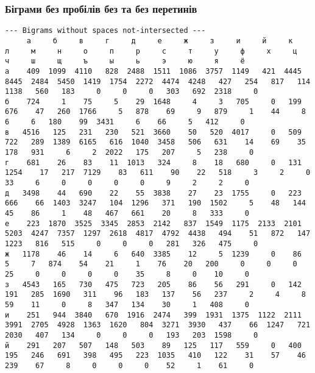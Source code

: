 \documentclass{article}
\begin{document}
\begin{landscape}
	\subsubsection{Біграми без пробілів без та без перетинів}
	\begin{addmargin}{0em}
		\begin{verbatim}
--- Bigrams without spaces not-intersected ---
     а     б     в     г     д     е     ж     з     и     й     к     л     м     н     о     п     р     с     т     у     ф     х     ц     ч     ш     щ     ъ     ы     ь     э     ю     я     ё    
а    409  1099  4110   828  2488  1511  1086  3757  1149   421  4445  8445  2484  5450  1419  1754  2272  4474  4248   427   254   817   114  1138   560   183     0     0     0   303   692  2318     0
б    724     1    75     5    29  1648     4     3   705     0   199   676    47   260  1766     5   878    69     9   879     1    44     8     6     6   180    99  3431     6    66     5   412     0
в   4516   125   231   230   521  3660    50   520  4017     0   509   722   289  1389  6165   616  1040  3458   506   631    14    69    35   178   931     6     2  2022   175   207     5   238     0
г    681    26    83    11  1013   324     8    18   680     0   131  1254    17   217  7129    83   611    90    22   518     3     2     0    33     6     0     0     0     0     9     2     2     0
д   3498    44   690    22    55  3838    27    23  1755     0   223   666    66  1403  3247   104  1296   371   190  1502     5    48   144    45    86     1    48   467   661    20     8   333     0
е    223  1870  3525  3345  2853  2142   837  1549  1175  2133  2101  5203  4247  7357  1297  2618  4817  4792  4438   494    51   872   147  1223   816   515     0     0     0   281   326   475     0
ж   1178    46    14     6   640  3385    12     5  1239     0    86     5     7   874    54    21     1    76    20   200     0     0     0    25     0     0     0     0    35     8     0    10     0
з   4543   165   730   475   723   205    86    56   291     0   142   191   285  1690   311    96   183   137    56   237     2     4     8    59    11     0     8   347   134    30     1   408     0
и    251   944  3840   670  1916  2474   399  1931  1375  1122  2111  3991  2705  4928  1363  1620   804  3271  3930   437    66  1247   721  2030   407   134     0     0     0   193   203  1598     0
й    291   207   507   148   503    89   125   117   559     0   400   195   246   691   398   495   223  1035   410   122    31    57    46   239    67     8     0     0     0    52     1    61     0

\end{verbatim}
\end{addmargin}
\end{landscape}
\end{document}
